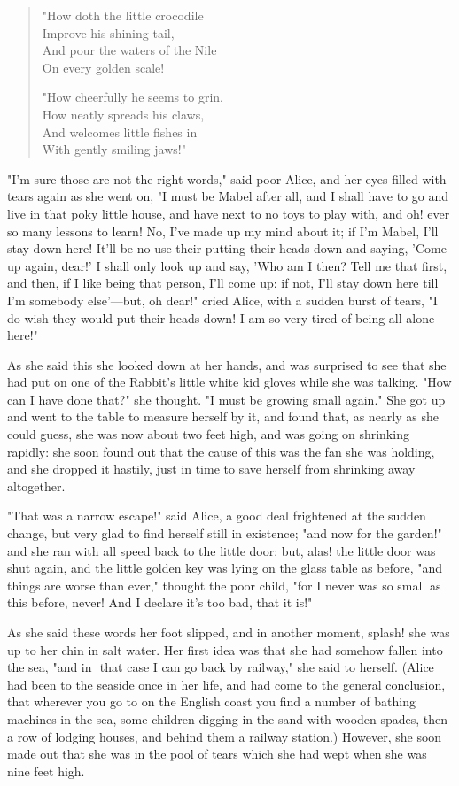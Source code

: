 \begin{quote}
"How doth the little crocodile\\
⁠Improve his shining tail,\\
And pour the waters of the Nile\\
⁠On every golden scale!

"How cheerfully he seems to grin,\\
⁠How neatly spreads his claws,\\
And welcomes little fishes in\\
⁠With gently smiling jaws!"
\end{quote}

​"I'm sure those are not the right words," said poor Alice, and her eyes filled with tears again as she went on, "I must be Mabel after all, and I shall have to go and live in that poky little house, and have next to no toys to play with, and oh! ever so many lessons to learn! No, I've made up my mind about it; if I'm Mabel, I'll stay down here! It'll be no use their putting their heads down and saying, 'Come up again, dear!' I shall only look up and say, 'Who am I then? Tell me that first, and then, if I like being that person, I'll come up: if not, I'll stay down here till I'm somebody else'—but, oh dear!" cried Alice, with a sudden burst of tears, "I do wish they would put their heads down! I am so very tired of being all alone here!"

As she said this she looked down at her hands, and was surprised to see that she had put on one of the Rabbit's little white kid gloves while she was talking. "How can I have done that?" she thought. "I must be growing small ​again." She got up and went to the table to measure herself by it, and found that, as nearly as she could guess, she was now about two feet high, and was going on shrinking rapidly: she soon found out that the cause of this was the fan she was holding, and she dropped it hastily, just in time to save herself from shrinking away altogether.

"That was a narrow escape!" said Alice, a good deal frightened at the sudden change, but very glad to find herself still in existence; "and now for the garden!" and she ran with all speed back to the little door: but, alas! the little door was shut again, and the little golden key was lying on the glass table as before, "and things are worse than ever," thought the poor child, "for I never was so small as this before, never! And I declare it's too bad, that it is!"

As she said these words her foot slipped, and in another moment, splash! she was up to her chin in salt water. Her first idea was that she had somehow fallen into the sea, "and in ​
that case I can go back by railway," she said to herself. (Alice had been to the seaside once in her life, and had come to the general conclusion, that wherever you go to on the English coast you find a number of bathing machines in the sea, some children digging in the sand with wooden spades, then a row of lodging houses, and behind them a railway station.) However, she soon made out that she was in the pool of tears which she had wept when she was nine feet high.

